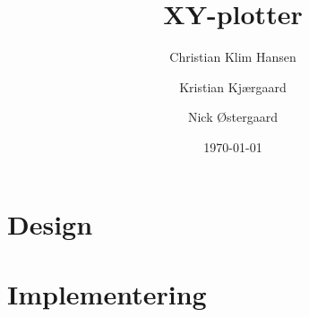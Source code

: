 \documentclass{../mypaper}
\title{XY-plotter}
\author{Christian Klim Hansen \and Kristian Kjærgaard \and Nick Østergaard}
\date{\today}
\begin{document}

\frontmatter

\tableofcontents



\mainmatter




\part{Design}





\part{Implementering}





\backmatter



\listoffigures

\listoftables

\listoffixmes
\end{document}
